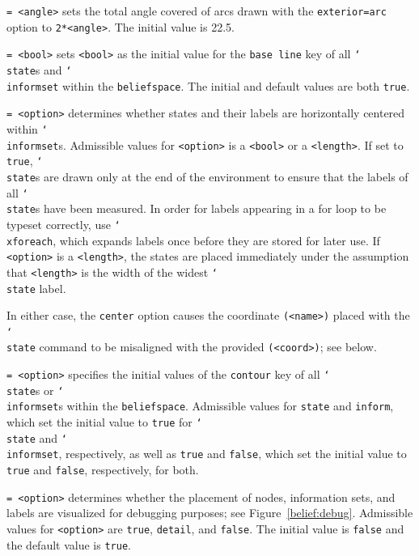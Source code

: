\documentclass{article}
\newenvironment{desc}{\itemize[leftmargin=50pt]}{\enditemize}
\def\option#1#2{\item[\texttt{#1}] \hskip-1.5pt\texttt{#2}}
\renewcommand{\textbackslash}{\char`\\}
\def\cmd#1{\texttt{\color{cmd}\textbackslash#1}}
\begin{document}
\begin{desc}
\option{arc}{= <angle>} sets the total angle covered of arcs drawn with the \texttt{exterior=arc} option to \texttt{2*<angle>}. The initial value is 22.5.

\option{base line}{= <bool>} sets \texttt{<bool>} as the initial value for the \texttt{base line} key of all \cmd{state}s and \cmd{informset} within the \texttt{beliefspace}. The initial and default values are both \texttt{true}.

\option{center}{= <option>} determines whether states and their labels are horizontally centered within \cmd{informset}s. Admissible values for \texttt{<option>} is a \texttt{<bool>} or a \texttt{<length>}. If set to \texttt{true}, \cmd{state}s are drawn only at the end of the environment to ensure that the labels of all \cmd{state}s have been measured. In order for labels appearing in a for loop to be typeset correctly, use \cmd{xforeach}, which expands labels once before they are stored for later use. %
If \texttt{<option>} is a \texttt{<length>}, the states are placed immediately under the assumption that \texttt{<length>} is the width of the widest \cmd{state} label.

{\color{player4}In either case, the \texttt{center} option causes the coordinate \texttt{(<name>)} placed with the \cmd{state} command to be misaligned with the provided \texttt{(<coord>)}; see below.}

\option{contour}{= <option>} specifies the initial values of the \texttt{contour} key of all \cmd{state}s or \cmd{informset}s within the \texttt{beliefspace}. Admissible values for \texttt{state} and \texttt{inform}, which set the initial value to \texttt{true} for \cmd{state} and \cmd{informset}, respectively, as well as \texttt{true} and \texttt{false}, which set the initial value to \texttt{true} and \texttt{false}, respectively, for both.

\option{debug}{= <option>} determines whether the placement of nodes, information sets, and labels are visualized for debugging purposes; see Figure~\ref{belief:debug}. Admissible values for \texttt{<option>} are \texttt{true}, \texttt{detail}, and \texttt{false}. The initial value is \texttt{false} and the default value is \texttt{true}.


\end{desc}
\end{document}
